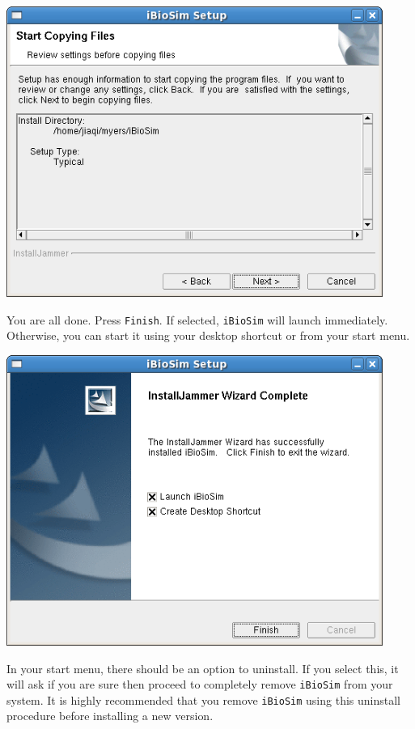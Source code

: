 \documentclass[titlepage,11pt]{article}
\begin{document}
\includegraphics[height=95mm]{screenshots/confirm}

You are all done.  Press {\tt Finish}.  If selected, {\tt iBioSim}
will launch immediately.  Otherwise, you can start it using your
desktop shortcut or from your start menu.

\includegraphics[height=95mm]{screenshots/finish}

In your start menu, there should be an option to uninstall.  If you
select this, it will ask if you are sure then proceed to completely
remove {\tt iBioSim} from your system.  It is highly recommended that
you remove {\tt iBioSim} using this uninstall procedure before
installing a new version.
\end{document}
